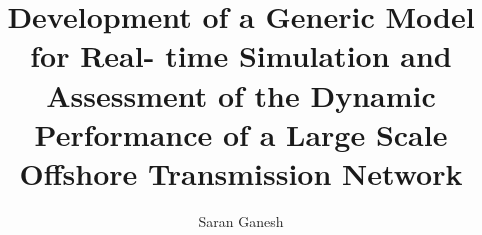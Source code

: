 \documentclass[oneside]{tudelft-report}
\numberwithin{equation}{chapter}
\begin{document}

\frontmatter

\title{Development of a Generic Model for Real- time Simulation and Assessment of the Dynamic Performance of a Large Scale Offshore Transmission Network}


\author{Saran Ganesh}






\tableofcontents


\listoffigures

\listoftables

\printglossary[title=List of Abbreviations]



\mainmatter








\begin{appendices}



%
\end{appendices}
%



\end{document}
